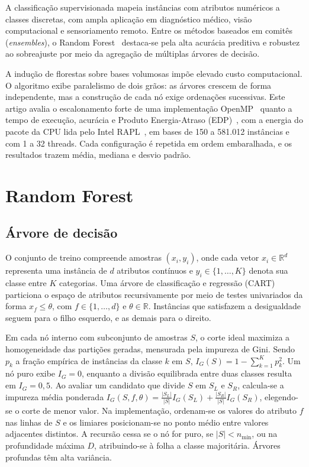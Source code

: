 \documentclass[12pt]{article}
\begin{document}
A classificação supervisionada mapeia instâncias com atributos numéricos a classes
discretas, com ampla aplicação em diagnóstico médico, visão computacional e
sensoriamento remoto. Entre os métodos baseados em comitês (\textit{ensembles}), o
Random Forest~\cite{breiman:2001,breiman:1984} destaca-se pela alta acurácia preditiva
e robustez ao sobreajuste por meio da agregação de múltiplas árvores de decisão.

A indução de florestas sobre bases volumosas impõe elevado custo computacional. O
algoritmo exibe paralelismo de dois grãos: as árvores crescem de forma independente,
mas a construção de cada nó exige ordenações sucessivas. Este artigo avalia o
escalonamento forte de uma implementação OpenMP~\cite{openmp:2018} quanto a tempo
de execução, acurácia e Produto Energia-Atraso (EDP)~\cite{gonzalez:1996}, com a
energia do pacote da CPU lida pelo Intel RAPL~\cite{david:2010}, em bases de 150 a
581{.}012 instâncias e com 1 a 32 threads. Cada configuração é repetida em ordem
embaralhada, e os resultados trazem média, mediana e desvio padrão.

\section{Random Forest}
\label{sec:rf}

\subsection{Árvore de decisão}

O conjunto de treino compreende amostras $(x_i, y_i)$, onde cada vetor
$x_i \in \mathbb{R}^d$ representa uma instância de $d$ atributos contínuos e
$y_i \in \{1, \dots, K\}$ denota sua classe entre $K$ categorias. Uma árvore de
classificação e regressão (CART)~\cite{breiman:1984} particiona o espaço de
atributos recursivamente por meio de testes univariados da forma $x_f \le \theta$,
com $f \in \{1, \dots, d\}$ e $\theta \in \mathbb{R}$. Instâncias que satisfazem a
desigualdade seguem para o filho esquerdo, e as demais para o direito.

Em cada nó interno com subconjunto de amostras $S$, o corte ideal maximiza a
homogeneidade das partições geradas, mensurada pela impureza de Gini. Sendo $p_k$ a
fração empírica de instâncias da classe $k$ em $S$, $I_G(S) = 1 - \sum_{k=1}^{K} p_k^2$.
Um nó puro exibe $I_G = 0$, enquanto a divisão equilibrada entre duas classes resulta
em $I_G = 0{,}5$. Ao avaliar um candidato que divide $S$ em $S_L$ e $S_R$, calcula-se a
impureza média ponderada
$I_G(S, f, \theta) = \frac{|S_L|}{|S|} I_G(S_L) + \frac{|S_R|}{|S|} I_G(S_R)$, elegendo-se
o corte de menor valor. Na implementação, ordenam-se os valores do atributo $f$ nas linhas
de $S$ e os limiares posicionam-se no ponto médio entre valores adjacentes distintos. A
recursão cessa se o nó for puro, se $|S| < n_{\min}$, ou na profundidade máxima $D$,
atribuindo-se à folha a classe majoritária. Árvores profundas têm alta variância.
\end{document}
